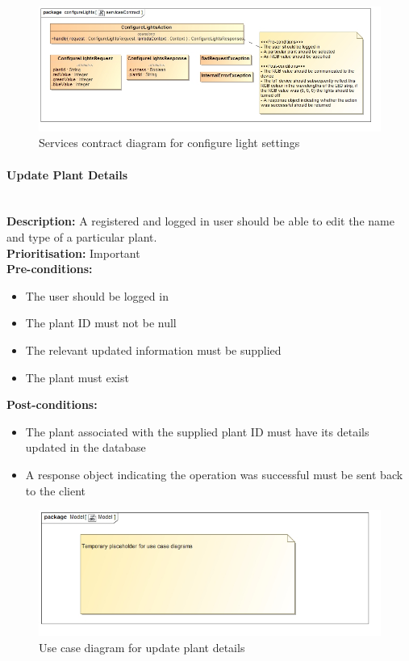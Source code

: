 \documentclass{article}
\begin{document}
		\begin{figure}[H]
			\includegraphics[width=\linewidth]{images/ServicesContracts/configureLights.jpg}
			\caption{Services contract diagram for configure light settings}
		\end{figure}
		
	\paragraph{Update Plant Details}\mbox{}\\
		\textbf{Description:} A registered and logged in user should be able to edit the name and type of a particular plant.\\
		\textbf{Prioritisation:} Important\\		
		\textbf{Pre-conditions:}
			\begin{itemize}
				\item The user should be logged in
				\item The plant ID must not be null
				\item The relevant updated information must be supplied
				\item The plant must exist
			\end{itemize}
		\textbf{Post-conditions:}
			\begin{itemize}
				\item The plant associated with the supplied plant ID must have its details updated in the database
				\item A response object indicating the operation was successful must be sent back to the client
			\end{itemize}

		\begin{figure}[H]
			\includegraphics[width=\linewidth]{images/tempUseCase.jpg}
			\caption{Use case diagram for update plant details}
		\end{figure}
		
\end{document}
